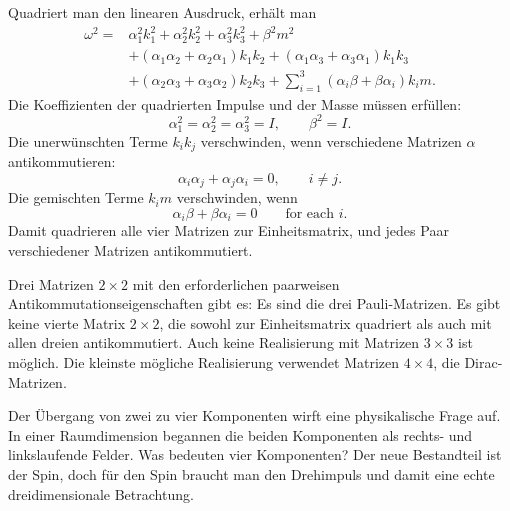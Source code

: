 Quadriert man den linearen Ausdruck, erhält man
\begin{align}
\omega^2
={}&
\alpha_1^2k_1^2+\alpha_2^2k_2^2+\alpha_3^2k_3^2+\beta^2m^2
\nonumber\\
&+(\alpha_1\alpha_2+\alpha_2\alpha_1)k_1k_2
+(\alpha_1\alpha_3+\alpha_3\alpha_1)k_1k_3
\nonumber\\
&+(\alpha_2\alpha_3+\alpha_3\alpha_2)k_2k_3
+\sum_{i=1}^{3}(\alpha_i\beta+\beta\alpha_i)k_i m.
\end{align}
Die Koeffizienten der quadrierten Impulse und der Masse müssen erfüllen:
\begin{equation}
\alpha_1^2=\alpha_2^2=\alpha_3^2=I,
\qquad
\beta^2=I.
\end{equation}
Die unerwünschten Terme \(k_i k_j\) verschwinden, wenn verschiedene Matrizen \(\alpha\) antikommutieren:
\begin{equation}
\alpha_i\alpha_j+\alpha_j\alpha_i=0,
\qquad i\neq j.
\end{equation}
Die gemischten Terme \(k_i m\) verschwinden, wenn
\begin{equation}
\alpha_i\beta+\beta\alpha_i=0
\qquad
\text{for each }i.
\end{equation}
Damit quadrieren alle vier Matrizen zur Einheitsmatrix, und jedes Paar verschiedener Matrizen antikommutiert.

Drei Matrizen \(2\times2\) mit den erforderlichen paarweisen Antikommutationseigenschaften gibt es: Es sind die drei Pauli-Matrizen. Es gibt keine vierte Matrix \(2\times2\), die sowohl zur Einheitsmatrix quadriert als auch mit allen dreien antikommutiert. Auch keine Realisierung mit Matrizen \(3\times3\) ist möglich. Die kleinste mögliche Realisierung verwendet Matrizen \(4\times4\), die Dirac-Matrizen.

Der Übergang von zwei zu vier Komponenten wirft eine physikalische Frage auf. In einer Raumdimension begannen die beiden Komponenten als rechts- und linkslaufende Felder. Was bedeuten vier Komponenten? Der neue Bestandteil ist der Spin, doch für den Spin braucht man den Drehimpuls und damit eine echte dreidimensionale Betrachtung.

